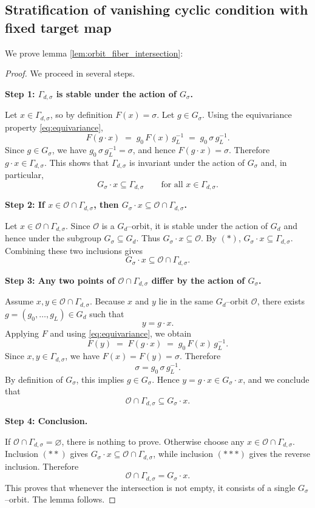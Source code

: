 \documentclass{article}
\theoremstyle{definition}
\begin{document}
\subsection*{Stratification of vanishing cyclic condition with fixed target map}
We prove lemma \ref{lem:orbit_fiber_intersection}:
\begin{proof}\label{proof-lem:orbit_fiber_intersection}
We proceed in several steps.

\medskip\noindent
\textbf{Step 1: $\Gamma_{d,\sigma}$ is stable under the action of $G_\sigma$.}

Let $x\in\Gamma_{d,\sigma}$, so by definition $F(x)=\sigma$.  
Let $g\in G_\sigma$. Using the equivariance property \eqref{eq:equivariance},
\[
F(g\cdot x)
\;=\;
g_0\,F(x)\,g_L^{-1}
\;=\;
g_0\,\sigma\,g_L^{-1}.
\]
Since $g\in G_\sigma$, we have $g_0\,\sigma\,g_L^{-1}=\sigma$, and hence
$F(g\cdot x)=\sigma$. Therefore $g\cdot x\in\Gamma_{d,\sigma}$.  
This shows that $\Gamma_{d,\sigma}$ is invariant under the action of $G_\sigma$ and,
in particular,
\[
G_\sigma\cdot x \subseteq \Gamma_{d,\sigma}
\qquad
\text{for all } x\in\Gamma_{d,\sigma} .
\tag{$\ast$}
\]

\medskip\noindent
\textbf{Step 2: If $x\in\mathcal O\cap\Gamma_{d,\sigma}$, then
$G_\sigma\cdot x\subseteq \mathcal O\cap\Gamma_{d,\sigma}$.}

Let $x\in\mathcal O\cap\Gamma_{d,\sigma}$.  
Since $\mathcal O$ is a $G_d$--orbit, it is stable under the action of $G_d$ and
hence under the subgroup $G_\sigma\subseteq G_d$. Thus $G_\sigma\cdot x\subseteq
\mathcal O$.  
By $(\ast)$, $G_\sigma\cdot x\subseteq \Gamma_{d,\sigma}$.  
Combining these two inclusions gives
\[
G_\sigma\cdot x \subseteq \mathcal O\cap\Gamma_{d,\sigma} .
\tag{$\ast\ast$}
\]

\medskip\noindent
\textbf{Step 3: Any two points of $\mathcal O\cap\Gamma_{d,\sigma}$ differ by the
action of $G_\sigma$.}

Assume $x,y\in\mathcal O\cap\Gamma_{d,\sigma}$.  
Because $x$ and $y$ lie in the same $G_d$--orbit $\mathcal O$, there exists
$g=(g_0,\dots,g_L)\in G_d$ such that
\[
y = g\cdot x .
\]
Applying $F$ and using \eqref{eq:equivariance}, we obtain
\[
F(y)
\;=\;
F(g\cdot x)
\;=\;
g_0\,F(x)\,g_L^{-1}.
\]
Since $x,y\in\Gamma_{d,\sigma}$, we have $F(x)=F(y)=\sigma$. Therefore
\[
\sigma = g_0\,\sigma\,g_L^{-1}.
\]
By definition of $G_\sigma$, this implies $g\in G_\sigma$. Hence
$y=g\cdot x\in G_\sigma\cdot x$, and we conclude that
\[
\mathcal O\cap\Gamma_{d,\sigma} \subseteq G_\sigma\cdot x .
\tag{$\ast\ast\ast$}
\]

\medskip\noindent
\textbf{Step 4: Conclusion.}

If $\mathcal O\cap\Gamma_{d,\sigma}=\varnothing$, there is nothing to prove.
Otherwise choose any $x\in\mathcal O\cap\Gamma_{d,\sigma}$.  
Inclusion $(\ast\ast)$ gives $G_\sigma\cdot x\subseteq \mathcal O\cap\Gamma_{d,\sigma}$,
while inclusion $(\ast\ast\ast)$ gives the reverse inclusion. Therefore
\[
\mathcal O\cap\Gamma_{d,\sigma} = G_\sigma\cdot x .
\]
This proves that whenever the intersection is not empty, it consists of a single
$G_\sigma$--orbit. The lemma follows.
\end{proof}
\end{document}
